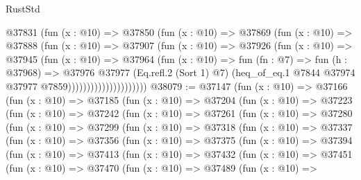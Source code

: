 \begin{lexlean}{RustStd}
\begin{coremodule}
                          @37831
                            (fun (x : @10) =>
                            @37850
                              (fun (x : @10) =>
                              @37869
                                (fun (x : @10) =>
                                @37888
                                  (fun (x : @10) =>
                                  @37907
                                    (fun (x : @10) =>
                                    @37926
                                      (fun (x : @10) =>
                                      @37945
                                        (fun (x : @10) =>
                                        @37964
                                          (fun (x : @10) =>
                                          fun (fn : @7) =>
                                          fun (h : @37968) =>
                                          @37976
                                            @37977
                                            (Eq.refl.{2} (Sort 1) @7)
                                            (heq_of_eq.{1}
                                              @7844
                                              @37974
                                              @37977
                                              @7859)))))))))))))))))))))
@38079 := @37147
    (fun (x : @10) =>
    @37166
      (fun (x : @10) =>
      @37185
        (fun (x : @10) =>
        @37204
          (fun (x : @10) =>
          @37223
            (fun (x : @10) =>
            @37242
              (fun (x : @10) =>
              @37261
                (fun (x : @10) =>
                @37280
                  (fun (x : @10) =>
                  @37299
                    (fun (x : @10) =>
                    @37318
                      (fun (x : @10) =>
                      @37337
                        (fun (x : @10) =>
                        @37356
                          (fun (x : @10) =>
                          @37375
                            (fun (x : @10) =>
                            @37394
                              (fun (x : @10) =>
                              @37413
                                (fun (x : @10) =>
                                @37432
                                  (fun (x : @10) =>
                                  @37451
                                    (fun (x : @10) =>
                                    @37470
                                      (fun (x : @10) =>
                                      @37489
                                        (fun (x : @10) =>

\end{coremodule}
\end{lexlean}
